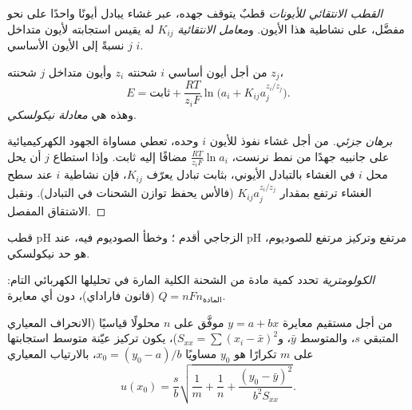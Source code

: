 \begin{definition}\label{def:b3:electrode-kinetics:ise}
\emph{القطب الانتقائي للأيونات} قطبٌ
يتوقف جهده، عبر غشاء يبادل أيونًا واحدًا على نحو مفضَّل،
على نشاطية هذا الأيون. و\emph{معامل
الانتقائية} $K_{ij}$ له يقيس استجابته لأيون
متداخل $j$ نسبةً إلى الأيون الأساسي $i$.
\end{definition}

\begin{proposition}\label{prop:b3:electrode-kinetics:nikolsky}
من أجل أيون أساسي $i$ شحنته $z_i$ وأيون متداخل $j$ شحنته $z_j$،
\[
  E = \text{ثابت} + \frac{RT}{z_iF}\ln\bigl(a_i + K_{ij}a_j^{z_i/z_j}\bigr) .
\]
وهذه هي \emph{معادلة نيكولسكي}.
\end{proposition}

\begin{proof}[برهان جزئي]
من أجل غشاء نفوذ للأيون $i$ وحده، تعطي مساواة الجهود
الكهركيميائية على جانبيه جهدًا من نمط نرنست، $\frac{RT}{z_iF}\ln a_i$ مضافًا إليه ثابت.
وإذا استطاع $j$ أن يحل محل $i$ في الغشاء بالتبادل الأيوني، بثابت
تبادل يعرّف $K_{ij}$، فإن نشاطية $i$ عند سطح الغشاء ترتفع بمقدار
$K_{ij}a_j^{z_i/z_j}$ (فالأس يحفظ توازن الشحنات في التبادل). ونقبل
الاشتقاق المفصل.
\end{proof}

قطب pH الزجاجي أقدم ؛ وخطأ
الصوديوم فيه، عند pH مرتفع وتركيز مرتفع للصوديوم، هو حد نيكولسكي.

\begin{definition}[الكولومترية]\label{def:b3:electrode-kinetics:coulometry}
\emph{الكولومترية} تحدد كمية مادة من
الشحنة الكلية المارة في تحليلها الكهربائي التام: $Q = nFn_{\text{المادة}}$ (قانون
فاراداي)، دون أي معايرة.
\end{definition}

\begin{proposition}\label{prop:b3:electrode-kinetics:inverse-prediction}
من أجل مستقيم معايرة $y = a + bx$ موفَّق على $n$ محلولًا قياسيًا (الانحراف المعياري
المتبقي $s$، والمتوسط $\bar y$، و$S_{xx} = \sum(x_i - \bar x)^2$)، يكون تركيز عيّنة متوسط
استجابتها على $m$ تكرارًا هو $y_0$ مساويًا $x_0 = (y_0 - a)/b$، بالارتياب
المعياري
\[
  u(x_0) = \frac{s}{b}\sqrt{\frac1m + \frac1n + \frac{(y_0 - \bar y)^2}{b^2S_{xx}}} .
\]
\end{proposition}

